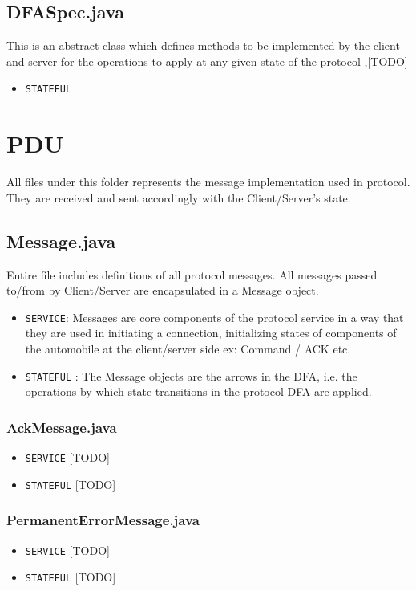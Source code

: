 \documentclass[12pt]{usenixsubmit}
\begin{document}
\subsection{DFASpec.java}This is an abstract class which defines methods to be implemented by the client and server for the operations to apply at any given state of the protocol ,[TODO]
\begin{itemize}
  \item {\tt STATEFUL}
\end{itemize}

  \section{PDU} All files under this folder represents the message implementation used in protocol. They are received and sent accordingly with the Client/Server's state.

     \subsection{Message.java} Entire file includes definitions of all protocol messages. All messages passed to/from by Client/Server are encapsulated in a Message object.
     \begin{itemize}
     \item {\tt SERVICE}:  Messages are core components of the protocol service in a way that they are used in initiating a connection, initializing states of components of the automobile at the client/server side ex: Command / ACK  etc.
     \item {\tt STATEFUL} : The Message objects are the arrows in the DFA, i.e. the operations by which state transitions in the protocol DFA are applied.
     \end{itemize}
\subsubsection{AckMessage.java}
     \begin{itemize}
     \item {\tt SERVICE} [TODO]
     \item {\tt STATEFUL} [TODO]
     \end{itemize}
       
     \subsubsection{PermanentErrorMessage.java}
     \begin{itemize}
     \item {\tt SERVICE} [TODO]
     \item {\tt STATEFUL} [TODO]
     \end{itemize}
\end{document}
